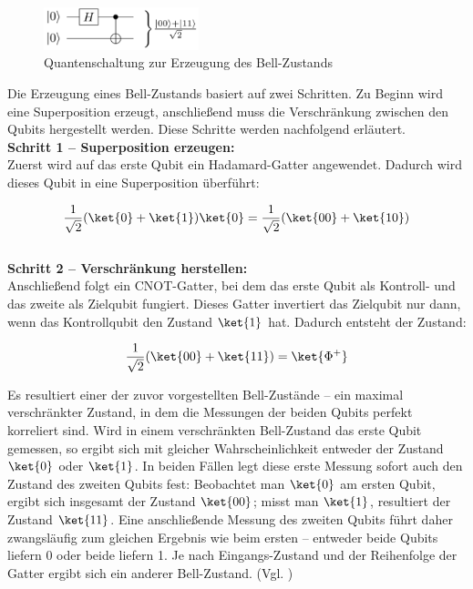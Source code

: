 \begin{figure}[h]
  \centering
  \includegraphics[width=0.4\textwidth]{images/quantum-information/bell_circuit.png}
  \caption{Quantenschaltung zur Erzeugung des Bell-Zustands}
\end{figure}

Die Erzeugung eines Bell-Zustands basiert auf zwei Schritten. Zu Beginn wird eine Superposition erzeugt, anschließend muss die Verschränkung zwischen den Qubits hergestellt werden. Diese Schritte werden nachfolgend erläutert.
\\


\textbf{Schritt 1 – Superposition erzeugen:} \\
Zuerst wird auf das erste Qubit ein Hadamard-Gatter angewendet. Dadurch wird dieses Qubit in eine Superposition überführt:

\[
\frac{1}{\sqrt{2}} (\ket{0} + \ket{1}) \ket{0} = \frac{1}{\sqrt{2}} (\ket{00} + \ket{10})
\]
\\


\textbf{Schritt 2 – Verschränkung herstellen:} \\
Anschließend folgt ein CNOT-Gatter, bei dem das erste Qubit als Kontroll- und das zweite als Zielqubit fungiert. Dieses Gatter invertiert das Zielqubit nur dann, wenn das Kontrollqubit den Zustand \(\ket{1}\) hat. Dadurch entsteht der Zustand:

\[
\frac{1}{\sqrt{2}} (\ket{00} + \ket{11}) = \ket{\Phi^+}
\]


Es resultiert einer der zuvor vorgestellten Bell-Zustände – ein maximal verschränkter Zustand, in dem die Messungen der beiden Qubits perfekt korreliert sind. Wird in einem verschränkten Bell-Zustand das erste Qubit gemessen, so ergibt sich mit gleicher Wahrscheinlichkeit entweder der Zustand \( \ket{0} \) oder \( \ket{1} \). In beiden Fällen legt diese erste Messung sofort auch den Zustand des zweiten Qubits fest: Beobachtet man \( \ket{0} \) am ersten Qubit, ergibt sich insgesamt der Zustand \( \ket{00} \); misst man \( \ket{1} \), resultiert der Zustand \( \ket{11} \). Eine anschließende Messung des zweiten Qubits führt daher zwangsläufig zum gleichen Ergebnis wie beim ersten – entweder beide Qubits liefern 0 oder beide liefern 1. Je nach Eingangs-Zustand und der Reihenfolge der Gatter ergibt sich ein anderer Bell-Zustand. (Vgl. \cite[S.53-54]{homeister_quantum_2022})
\\


